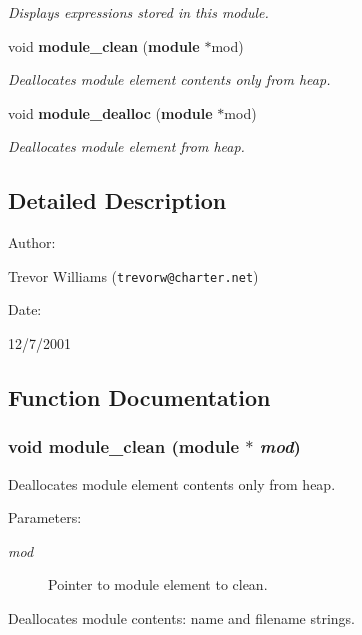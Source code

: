 \begin{CompactItemize}
\begin{CompactList}\small\item\em Displays expressions stored in this module.\item\end{CompactList}\item 
void {\bf module\_\-clean} ({\bf module} $\ast$mod)
\begin{CompactList}\small\item\em Deallocates module element contents only from heap.\item\end{CompactList}\item 
void {\bf module\_\-dealloc} ({\bf module} $\ast$mod)
\begin{CompactList}\small\item\em Deallocates module element from heap.\item\end{CompactList}\end{CompactItemize}


\subsection{Detailed Description}


\begin{Desc}
\item[Author: ]\par
Trevor Williams ({\tt trevorw@charter.net}) \end{Desc}
\begin{Desc}
\item[Date: ]\par
12/7/2001\end{Desc}


\subsection{Function Documentation}
\subsubsection{\setlength{\rightskip}{0pt plus 5cm}void module\_\-clean ({\bf module} $\ast$ {\em mod})}\label{module_8c_a7}


Deallocates module element contents only from heap.

\begin{Desc}
\item[Parameters: ]\par
\begin{description}
\item[{\em 
mod}]Pointer to module element to clean.\end{description}
\end{Desc}
Deallocates module contents: name and filename strings. 
